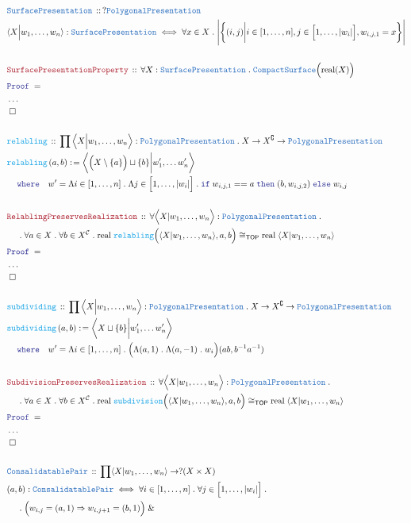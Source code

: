 \documentclass[12pt]{scrartcl}
\newcommand{\TYPE}[1]{\textcolor{NavyBlue}{\mathtt{#1}}}
\newcommand{\FUNC}[1]{\textcolor{Cerulean}{\mathtt{#1}}}
\newcommand{\LOGIC}[1]{\textcolor{Blue}{\mathtt{#1}}}
\newcommand{\THM}[1]{\textcolor{Maroon}{\mathtt{#1}}}
\renewcommand{\.}{\; . \;}
\newcommand{\de}{: \kern 0.1pc =}
\newcommand{\where}{\LOGIC{where}}
\newcommand{\If}{\LOGIC{if} \;}
\newcommand{\Then}{ \; \LOGIC{then} \;}
\newcommand{\Else}{\; \LOGIC{else} \;}
\newcommand{\Act}[1]{\left( #1 \right)}
\newcommand{\Theorem}[2]{& \THM{#1} \, :: \, #2 \\ & \Proof = \\ }
\newcommand{\DeclareType}[2]{& \TYPE{#1} \, :: \, #2 \\}
\newcommand{\DefineType}[3]{& #1 : \TYPE{#2} \iff #3 \\}
\newcommand{\DeclareFunc}[2]{& \FUNC{#1} \, :: \, #2 \\}
\newcommand{\DefineFunc}[3]{&  \FUNC{#1}\Act{#2} \de #3 \\}
\newcommand{\NewLine}{\\ & \kern 1pc}
\newcommand{\Page}[1]{ \begin{align*} #1 \end{align*}   }
\newcommand{\NoProof}{ & \ldots \\ \EndProof}
\renewcommand{\And}{\; \& \;}
\newcommand{\Imply}{\Rightarrow}
\renewcommand{\c}{\complement}
\newcommand{\QED}{\; \square}
\newcommand{\EndProof}{& \QED \\}
\newcommand{\Proof}{\LOGIC{Proof} \; }
\newcommand{\C}{\mathcal{C}}
\newcommand{\TOP}{\mathsf{TOP}}
\newcommand{\CS}{\TYPE{CompactSurface}}
\begin{document}
\Page{
	\DeclareType{SurfacePresentation}{?\TYPE{PolygonalPresentation}}
	\DefineType{\langle X \Big| w_1, \ldots, w_n \rangle }{SurfacePresentation}
	{
		\forall x \in X \. 
			\Bigg| 
				\bigg\{ 
					(i,j) 
					\bigg| 
					i \in [1,\ldots,n ],
					j \in \Big[1, \ldots, |w_i| \Big],
					w_{i,j,1} = x
				\bigg\} 
			\Bigg|
	}
	\\
	\Theorem{SurfacePresentationProperty}
	{
		\forall X : \TYPE{SurfacePresentation} \.
		\CS\Big(\mathrm{real}(X) \Big)
	}
	\NoProof
	\\
	\DeclareFunc{relabling}{
		\prod \Big\langle X \Big|w_1,\ldots,w_n \Big\rangle : \TYPE{PolygonalPresentation} \.
		X \to X^\c \to \TYPE{PolygonalPresentation}
	}
	\DefineFunc{relabling}{a,b}
	{
		\bigg\langle \Big(X \setminus \{a\}\Big) \sqcup \{b\}\bigg| w'_1,\ldots w'_n  \bigg\rangle
		\NewLine
		\where
		\quad
		w' = \Lambda i \in [1,\ldots,n] \. \Lambda j \in \Big[1,\ldots, | w_i |\Big] \. 
		\If w_{i,j,1} == a \Then (b,w_{i,j,2}) \Else w_{i,j}
	}
	\\
	\Theorem{RelablingPreservesRealization}
	{
		\forall \Big\langle X | w_1,\ldots,w_n \Big\rangle : \TYPE{PolygonalPresentation} \. \NewLine \. 
		\forall a \in X \.
		\forall b \in X^\C \.
		\mathrm{real}\;\FUNC{relabling}\Big( \langle X | w_1,\ldots, w_n \rangle, a, b \Big) \cong_\TOP
		\mathrm{real} \;  \langle X | w_1, \ldots,w_n \rangle
	}
	\NoProof
	\\
	\DeclareFunc{subdividing}{
		\prod \Big\langle X \Big|w_1,\ldots,w_n \Big\rangle : \TYPE{PolygonalPresentation} \.
		X \to X^\c \to \TYPE{PolygonalPresentation}
	}
	\DefineFunc{subdividing}{a,b}
	{
		\bigg\langle  X \sqcup \{b\}\bigg| w'_1,\ldots w'_n  \bigg\rangle
		\NewLine
		\where
		\quad
		w' = \Lambda i \in [1,\ldots,n] \. \Big(\Lambda (a,1)  \. \Lambda (a,-1) \. w_i  \Big)(ab,b^{-1}a^{-1})
	}
	\\
	\Theorem{SubdivisionPreservesRealization}
	{
		\forall \Big\langle X | w_1,\ldots,w_n \Big\rangle : \TYPE{PolygonalPresentation} \. \NewLine \. 
		\forall a \in X \.
		\forall b \in X^\C \.
		\mathrm{real}\;\FUNC{subdivision}\Big( \langle X | w_1,\ldots, w_n \rangle, a, b \Big) \cong_\TOP
		\mathrm{real} \;  \langle X | w_1, \ldots,w_n \rangle
	}
	\NoProof
	\\
	\DeclareType{ConsalidatablePair}{
		\prod \langle X | w_1,\ldots,w_n \rangle \to ?(X \times X)
	}
	\DefineType{(a,b) }{ConsalidatablePair}
	{
		\forall i \in [1,\ldots,n] \. 
		\forall j \in \Big[1,\ldots,|w_{i}|\Big] \. \NewLine \. 
		\Big(w_{i,j} = (a,1) \Imply w_{i,j+1} = (b,1) \Big)
		\And
}}
\end{document}
